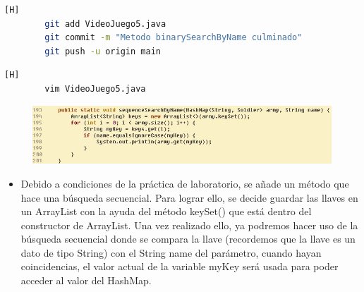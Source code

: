 \documentclass{article}
\begin{document}
	
	
	\begin{lstlisting}[language=bash,caption={Commit: 556b06b12e835c82e309c4ad3dcde5ced22e2b94}][H]
		git add VideoJuego5.java
		git commit -m "Metodo binarySearchByName culminado"			
		git push -u origin main
	\end{lstlisting}
	

	
	\begin{lstlisting}[language=bash,caption={Se implementa el método que hace la búsqueda secuencial de un Soldier por su nombre}][H]
		vim VideoJuego5.java
	\end{lstlisting}
	
	\begin{figure}[H]
		\centering
		\includegraphics[width=1\textwidth,keepaspectratio]{img/sequence.jpg}
	\end{figure}
	
	
	\begin{itemize}	
		\item Debido a condiciones de la práctica de laboratorio, se añade un método que hace una búsqueda secuencial. Para lograr ello, se decide guardar las llaves en un ArrayList con la ayuda del método keySet() que está dentro del constructor de ArrayList. Una vez realizado ello, ya podremos hacer uso de la búsqueda secuencial donde se compara la llave (recordemos que la llave es un dato de tipo String) con el String name del parámetro, cuando hayan coincidencias, el valor actual de la variable myKey será usada para poder acceder al valor del HashMap.
	\end{itemize}
	
\end{document}
